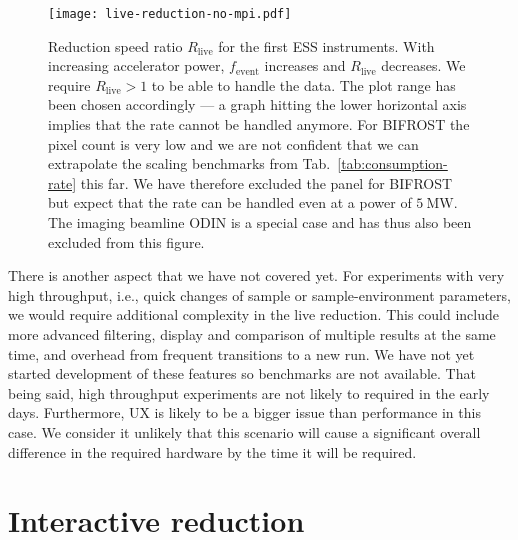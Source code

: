 \documentclass[a4paper,english,numbers=noenddot,bibliography=totoc,chapterprefix=on,DIV=12]{scrartcl}
\newcommand{\Fevent}{f_{\text{event}}}
\newcommand{\bifrost}{BIFROST\xspace}
\newcommand{\odin}{ODIN\xspace}
\begin{document}
\begin{figure}
  \centering
\texttt{[image: live-reduction-no-mpi.pdf]}
\caption{\label{fig:live-reduction-no-mpi}Reduction speed ratio $R_{\text{live}}$ for the first ESS instruments.
With increasing accelerator power, $\Fevent$ increases and $R_{\text{live}}$ decreases.
We require $R_{\text{live}} > 1$ to be able to handle the data.
The plot range has been chosen accordingly --- a graph hitting the lower horizontal axis implies that the rate cannot be handled anymore.
For \bifrost the pixel count is very low and we are not confident that we can extrapolate the scaling benchmarks from Tab.~\ref{tab:consumption-rate} this far.
We have therefore excluded the panel for \bifrost but expect that the rate can be handled even at a power of $5~\mathrm{MW}$.
The imaging beamline \odin is a special case and has thus also been excluded from this figure.
}
\end{figure}

There is another aspect that we have not covered yet.
For experiments with very high throughput, i.e., quick changes of sample or sample-environment parameters, we would require additional complexity in the live reduction.
This could include more advanced filtering, display and comparison of multiple results at the same time, and overhead from frequent transitions to a new run.
We have not yet started development of these features so benchmarks are not available.
That being said, high throughput experiments are not likely to required in the early days.
Furthermore, UX is likely to be a bigger issue than performance in this case.
We consider it unlikely that this scenario will cause a significant overall difference in the required hardware by the time it will be required.

\section{Interactive reduction}
\end{document}
